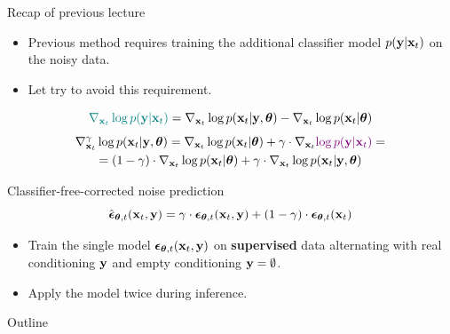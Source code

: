 \begin{frame}{Recap of previous lecture}
	\begin{itemize}
		\item Previous method requires training the additional classifier model $p(\mathbf{y} | \mathbf{x}_t)$ on the noisy data.	
		\item Let try to avoid this requirement.
	\end{itemize}
	\[
		{\color{teal}\nabla_{\mathbf{x}_t} \log p(\mathbf{y} | \mathbf{x}_t)} =  \nabla_{\mathbf{x}_t} \log p(\mathbf{x}_t| \mathbf{y}, \boldsymbol{\theta}) -\nabla_{\mathbf{x}_t} \log  p(\mathbf{x}_t | \boldsymbol{\theta})
	\]
	\vspace{-0.4cm}
	\begin{multline*}
		\nabla_{\mathbf{x}_t}^{\gamma} \log p(\mathbf{x}_t | \mathbf{y}, \boldsymbol{\theta}) = \nabla_{\mathbf{x}_t} \log p(\mathbf{x}_t | \boldsymbol{\theta}) + \gamma \cdot \nabla_{\mathbf{x}_t} {\color{violet}\log p(\mathbf{y} | \mathbf{x}_t)} = \\
		=  (1 - \gamma) \cdot  \nabla_{\mathbf{x}_t} \log p(\mathbf{x}_t | \boldsymbol{\theta}) + \gamma \cdot  \nabla_{\mathbf{x}_t} \log p(\mathbf{x}_t| \mathbf{y}, \boldsymbol{\theta})
	\end{multline*}
	\vspace{-0.4cm}
	\begin{block}{Classifier-free-corrected noise prediction}
		\vspace{-0.3cm}
		\[
			\hat{\boldsymbol{\epsilon}}_{\boldsymbol{\theta}, t}(\mathbf{x}_t, \mathbf{y}) = \gamma \cdot \boldsymbol{\epsilon}_{\boldsymbol{\theta}, t}(\mathbf{x}_t, \mathbf{y}) + (1 - \gamma) \cdot \boldsymbol{\epsilon}_{\boldsymbol{\theta}, t}(\mathbf{x}_t)
		\]
		\vspace{-0.5cm}
	\end{block}
	\begin{itemize}
		\item Train the single model $\boldsymbol{\epsilon}_{\boldsymbol{\theta}, t}(\mathbf{x}_t, \mathbf{y})$ on \textbf{supervised} data alternating with real conditioning $\mathbf{y}$ and empty conditioning $\mathbf{y} = \emptyset$.
		\item Apply the model twice during inference.
	\end{itemize}
\end{frame}
\begin{frame}{Outline}
	\tableofcontents
\end{frame}
